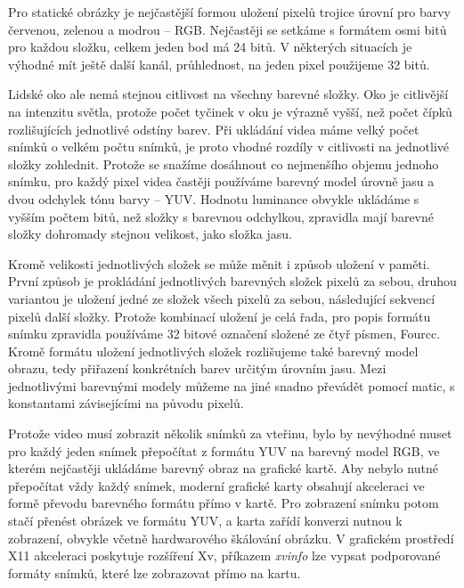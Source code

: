 Pro statické obrázky je nejčastější formou uložení pixelů trojice úrovní pro barvy červenou, zelenou a modrou -- RGB. Nejčastěji se setkáme s formátem
osmi bitů pro každou složku, celkem jeden bod má 24 bitů. V některých situacích je výhodné mít ještě další kanál, průhlednost, na jeden pixel použijeme 32 bitů. 

Lidské oko ale nemá stejnou citlivost na všechny barevné složky. Oko je citlivější na intenzitu světla, protože počet tyčinek v oku je výrazně vyšší,
než počet čípků rozlišujících jednotlivé odstíny barev. Při ukládání videa
máme velký počet snímků o velkém počtu snímků, je proto vhodné rozdíly v citlivosti na jednotlivé složky zohlednit. Protože se snažíme dosáhnout co nejmenšího objemu jednoho snímku, pro každý pixel videa častěji používáme
barevný model úrovně jasu a dvou odchylek tónu barvy -- YUV. Hodnotu luminance obvykle ukládáme s vyšším počtem bitů, než složky s barevnou odchylkou, zpravidla mají barevné složky dohromady stejnou velikost, jako
složka jasu.

Kromě velikosti jednotlivých složek se může měnit i způsob uložení v paměti.
První způsob je prokládání jednotlivých barevných složek pixelů za sebou, 
druhou variantou je uložení jedné ze složek všech pixelů za sebou, následující sekvencí pixelů další složky. Protože kombinací uložení je celá
řada, pro popis formátu snímku zpravidla používáme 32 bitové označení složené ze čtyř písmen, Fourcc\cite{fourcc}. Kromě formátu uložení jednotlivých složek rozlišujeme také barevný model obrazu, tedy přiřazení
konkrétních barev určitým úrovním jasu. Mezi jednotlivými barevnými modely můžeme na jiné snadno převádět pomocí matic, s konstantami závisejícími na původu pixelů.

Protože video musí zobrazit několik snímků za vteřinu, bylo by nevýhodné muset pro každý jeden snímek přepočítat z formátu YUV na barevný model RGB,
ve kterém nejčastěji ukládáme barevný obraz na grafické kartě. Aby nebylo nutné přepočítat vždy každý snímek, moderní grafické karty obsahují akceleraci ve formě převodu barevného formátu přímo v kartě. Pro zobrazení snímku potom stačí přenést obrázek ve formátu YUV, a karta zařídí konverzi 
nutnou k zobrazení, obvykle včetně hardwarového škálování obrázku. V grafickém prostředí X11 akceleraci poskytuje rozšíření Xv, příkazem {\em xvinfo} lze vypsat podporované formáty snímků, které lze zobrazovat přímo na kartu.

